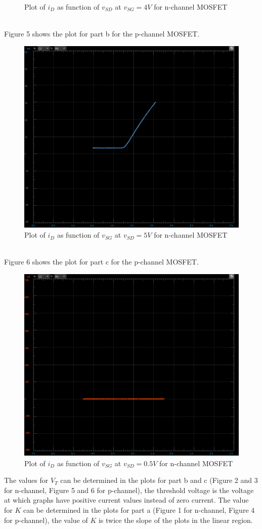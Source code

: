 \documentclass[12pt]{article}
\begin{document}
\begin{enumerate}
\begin{enumerate}
\begin{figure}[h!]
            \caption{Plot of $i_D$ as function of $v_{SD}$ at $v_{SG} = 4V$ for n-channel MOSFET}                        
        \end{figure} \pagebreak \\
        Figure 5 shows the plot for part b for the p-channel MOSFET.
        \begin{figure}[h!]
            \centering
            \includegraphics[width=0.5\linewidth]{PBVD5.png}
            \caption{Plot of $i_D$ as function of $v_{SG}$ at $v_{SD} = 5V$ for n-channel MOSFET}                        
        \end{figure} \\
        Figure 6 shows the plot for part c for the p-channel MOSFET.
        \begin{figure}[h!]
            \centering
            \includegraphics[width=0.5\linewidth]{PCVD50.png}
            \caption{Plot of $i_D$ as function of $v_{SG}$ at $v_{SD} = 0.5V$ for n-channel MOSFET}                        
        \end{figure} \pagebreak
    \end{enumerate}
    The values for $V_T$ can be determined in the plots for part b and c (Figure 2 and 3 for n-channel, Figure 5 and 6 for p-channel), the threshold voltage is the voltage at which graphs have positive current values instead of zero current. The value for $K$ can be determined in the plots for part a (Figure 1 for n-channel, Figure 4 for p-channel), the value of $K$ is twice the slope of the plots in the linear region. 

\end{enumerate}
\end{document}
